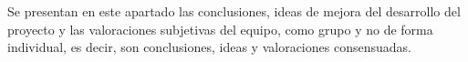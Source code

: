 Se presentan en este apartado las conclusiones, ideas de mejora del desarrollo del proyecto y las valoraciones subjetivas del equipo, como grupo y no de forma individual, es decir, son conclusiones, ideas y valoraciones consensuadas.